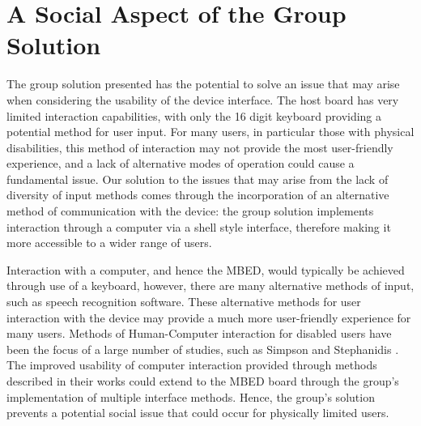 \section{A Social Aspect of the Group Solution} 

The group solution presented has the potential to solve an issue that may arise 
when considering the usability of the device interface.
The host board has very limited interaction capabilities, with only the 16 digit 
keyboard providing a potential method for user input.
For many users, in particular those with physical disabilities,
 this method of interaction may not provide the most user-friendly 
experience, and a lack of alternative modes of operation could cause  a 
fundamental issue.
Our solution to the issues that may arise from the lack of diversity of input 
methods comes through the incorporation of an alternative method of communication
with the device: the group solution implements interaction through a computer 
via a shell style interface, therefore making it more accessible to a wider 
range of users.
\par\bigskip\noindent 
Interaction with a computer, and hence the MBED, would typically be achieved 
through use of a keyboard, however, there are many alternative methods of input, 
such as speech recognition software. 
These alternative methods for user interaction with the device may provide a 
much more user-friendly experience for many users. 
Methods of Human-Computer interaction for disabled users have been the focus of 
a large number of studies, such as Simpson and Stephanidis 
\cite{disabled-book, disabled-book2}. The improved usability of computer 
interaction provided through methods described in their works could extend to the 
MBED board through the group's implementation of multiple interface methods.
Hence, the group's solution prevents a potential social issue that could occur 
for physically limited users.  
